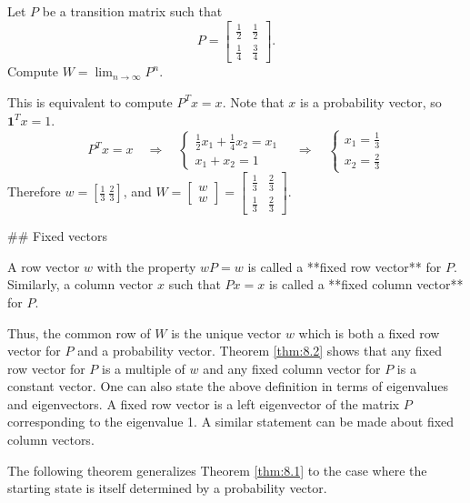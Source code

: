 \begin{example}
Let $P$ be a transition matrix such that 
\begin{equation*}
    P = \begin{bmatrix}  \frac{1}{2} & \frac{1}{2} \\ \frac{1}{4} & \frac{3}{4} \end{bmatrix}.
\end{equation*}
Compute $W = \lim_{n\to\infty} P^n$. 

This is equivalent to compute $P^T x = x$. Note that $x$ is a probability vector, so $\mathbf{1}^T x = 1$.
\begin{equation*}
    P^T x = x \quad \Rightarrow \quad \begin{cases} \frac{1}{2} x_1 + \frac{1}{4}x_2 = x_1 \\ x_1+x_2 = 1 \end{cases} \quad \Rightarrow \quad
    \begin{cases} x_1 = \frac{1}{3} \\ x_2 = \frac{2}{3} \end{cases}
\end{equation*}
Therefore $w = [\frac{1}{3} \ \frac{2}{3}]$, and $W = \begin{bmatrix} w \\ w \end{bmatrix} = \begin{bmatrix} \frac{1}{3} & \frac{2}{3} \\ \frac{1}{3} & \frac{2}{3} \end{bmatrix}$.
\end{example}

## Fixed vectors
\begin{definition}
A row vector $w$ with the property $wP = w$ is called a **fixed row vector** for $P$. Similarly, a column vector $x$ such that $Px = x$ is called a **fixed column vector** for $P$.
\end{definition}

Thus, the common row of $W$ is the unique vector $w$ which is both a fixed row vector for $P$ and a probability vector. Theorem \ref{thm:8.2} shows that any fixed row vector for $P$ is a multiple of $w$ and any fixed column vector for $P$ is a constant vector. One can also state the above definition in terms of eigenvalues and eigenvectors. A fixed row vector is a left eigenvector of the matrix $P$ corresponding to the eigenvalue 1. A similar statement can be made about fixed column vectors.

The following theorem generalizes Theorem \ref{thm:8.1} to the case where the starting state is itself
determined by a probability vector.

